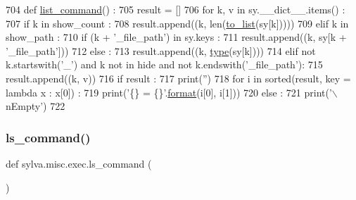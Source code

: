 \begin{DoxyCode}
704 \textcolor{keyword}{def }\hyperlink{namespacesylva_1_1misc_1_1exec_af0ed98897004764988fba9af76290e90}{list\_command}() :
705   result = []
706   \textcolor{keywordflow}{for} k, v \textcolor{keywordflow}{in} sy.\_\_dict\_\_.items() :
707     \textcolor{keywordflow}{if} k \textcolor{keywordflow}{in} show\_count :
708       result.append((k, len(\hyperlink{namespacesylva_1_1misc_1_1util_a03f5cfd365a10a5ec0567e320f987a9b}{to\_list}(sy[k]))))
709     \textcolor{keywordflow}{elif} k \textcolor{keywordflow}{in} show\_path :
710       \textcolor{keywordflow}{if} (k + \textcolor{stringliteral}{'\_file\_path'}) \textcolor{keywordflow}{in} sy.keys :
711         result.append((k, sy[k + \textcolor{stringliteral}{'\_file\_path'}]))
712       \textcolor{keywordflow}{else} :
713         result.append((k, \hyperlink{namespacesylva_1_1misc_1_1exec_a55d55e6d0e68715dfbd883034bd7290c}{type}(sy[k])))
714     \textcolor{keywordflow}{elif} \textcolor{keywordflow}{not} k.startswith(\textcolor{stringliteral}{'\_'}) \textcolor{keywordflow}{and} k \textcolor{keywordflow}{not} \textcolor{keywordflow}{in} hide \textcolor{keywordflow}{and} \textcolor{keywordflow}{not} k.endswith(\textcolor{stringliteral}{'\_file\_path'}):
715       result.append((k, v))
716   \textcolor{keywordflow}{if} result :
717     print(\textcolor{stringliteral}{''})
718     \textcolor{keywordflow}{for} i \textcolor{keywordflow}{in} sorted(result, key = \textcolor{keyword}{lambda} x : x[0]) :
719       print(\textcolor{stringliteral}{'\{\} = \{\}'}.\hyperlink{namespacesylva_1_1examples_1_1hsdfg_ab3510a0b8457362330aa4d9fd2209590}{format}(i[0], i[1]))
720   \textcolor{keywordflow}{else} :
721     print(\textcolor{stringliteral}{'\(\backslash\)nEmpty'})
722 
\end{DoxyCode}
\mbox{\label{namespacesylva_1_1misc_1_1exec_a2a286b4556ac1dcfb9fa47e672f7bee0}} 
\subsubsection{\texorpdfstring{ls\+\_\+command()}{ls\_command()}}
{\footnotesize\ttfamily def sylva.\+misc.\+exec.\+ls\+\_\+command (\begin{DoxyParamCaption}{ }\end{DoxyParamCaption})}



